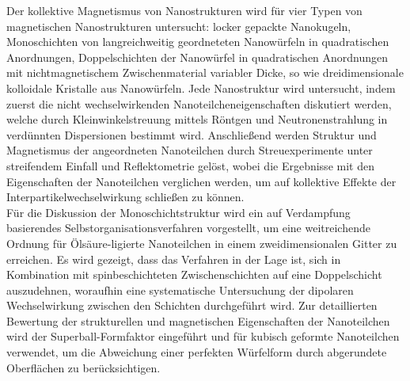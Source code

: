 \documentclass[\main/dresen_thesis.tex]{subfiles}
\begin{document}
  Der kollektive Magnetismus von Nanostrukturen wird für vier Typen von magnetischen Nanostrukturen untersucht: locker gepackte Nanokugeln, Monoschichten von langreichweitig geordneteten Nanowürfeln in quadratischen Anordnungen, Doppelschichten der Nanowürfel in quadratischen Anordnungen mit nichtmagnetischem Zwischenmaterial variabler Dicke, so wie dreidimensionale kolloidale Kristalle aus Nanowürfeln.
  Jede Nanostruktur wird untersucht, indem zuerst die nicht wechselwirkenden Nanoteilcheneigenschaften diskutiert werden, welche durch Kleinwinkelstreuung mittels Röntgen und Neutronenstrahlung in verdünnten Dispersionen bestimmt wird.
  Anschließend werden Struktur und Magnetismus der angeordneten Nanoteilchen durch Streuexperimente unter streifendem Einfall und Reflektometrie gelöst, wobei die Ergebnisse mit den Eigenschaften der Nanoteilchen verglichen werden, um auf kollektive Effekte der Interpartikelwechselwirkung schließen zu können.
  \\

  Für die Diskussion der Monoschichtstruktur wird ein auf Verdampfung basierendes Selbstorganisationsverfahren vorgestellt, um eine weitreichende Ordnung für Ölsäure-ligierte Nanoteilchen in einem zweidimensionalen Gitter zu erreichen.
  Es wird gezeigt, dass das Verfahren in der Lage ist, sich in Kombination mit spinbeschichteten Zwischenschichten auf eine Doppelschicht auszudehnen, woraufhin eine systematische Untersuchung der dipolaren Wechselwirkung zwischen den Schichten durchgeführt wird.
  Zur detaillierten Bewertung der strukturellen und magnetischen Eigenschaften der Nanoteilchen wird der Superball-Formfaktor eingeführt und für kubisch geformte Nanoteilchen verwendet, um die Abweichung einer perfekten Würfelform durch abgerundete Oberflächen zu berücksichtigen.
\end{document}
